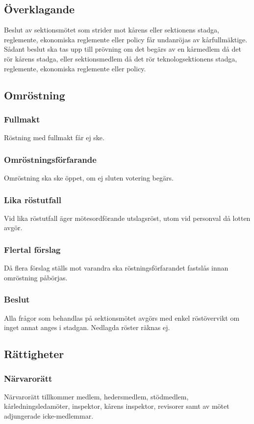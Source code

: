 \documentclass[a4paper]{dtek}
\begin{document}
\subsection{Överklagande}
Beslut av sektionsmötet som strider mot kårens eller sektionens stadga, reglemente, ekonomiska reglemente eller policy får undanröjas av kårfullmäktige. Sådant beslut ska tas upp till prövning om det begärs av en kårmedlem då det rör kårens stadga, eller sektionsmedlem då det rör teknologsektionens stadga, reglemente, ekonomiska reglemente eller policy.
\subsection{Omröstning}
\subsubsection{Fullmakt}
Röstning med fullmakt får ej ske.
\subsubsection{Omröstningsförfarande}
Omröstning ska ske öppet, om ej sluten votering begärs.
\subsubsection{Lika röstutfall}
Vid lika röstutfall äger mötesordförande utslagsröst, utom vid personval då lotten avgör.
\subsubsection{Flertal förslag}
Då flera förslag ställs mot varandra ska röstningsförfarandet fastslås innan omröstning påbörjas.
\subsubsection{Beslut}
Alla frågor som behandlas på sektionsmötet avgörs med enkel röstövervikt om inget annat anges i stadgan. Nedlagda röster räknas ej.
\subsection{Rättigheter}
\subsubsection{Närvarorätt}
Närvarorätt tillkommer medlem, hedersmedlem, stödmedlem, kårledningsledamöter, inspektor, kårens inspektor, revisorer samt av mötet adjungerade icke-medlemmar.
\end{document}
